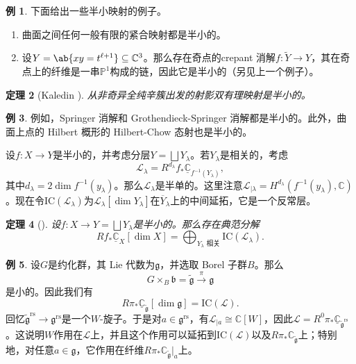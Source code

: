 \documentclass{amsart}
\newtheorem{thm}{定理}[section]
\theoremstyle{definition}
\newtheorem{exm}[thm]{例}
\newtheorem{exms}[thm]{例}
\theoremstyle{remark}
\theoremstyle{plain}
\theoremstyle{definition}
\theoremstyle{remark}
\newcommand{\C}{\mathbb{C}}
\renewcommand{\P}{\mathbb{P}}
\newcommand{\g}{\mathfrak{g}}
\renewcommand{\b}{\mathfrak{b}}
\newcommand{\mc}[1]{\mathcal{#1}}
\newcommand{\mr}[1]{\mathrm{#1}}
\newcommand{\on}[1]{\operatorname{#1}}
\newcommand{\ol}[1]{\overline{#1}}
\newcommand{\ul}[1]{\underline{#1}}
\newcommand{\1}{\mathbf{1}}
\newcommand{\2}{\mathbf{2}}
\newcommand{\3}{\mathbf{3}}
\begin{document}
\begin{exms}
    下面给出一些半小映射的例子。
    \begin{enumerate}
        \item 曲面之间任何一般有限的紧合映射都是半小的。
        \item 设\(Y = \ab\{xy = t^{\ell+1}\} \subseteq \C^3\)。那么存在奇点的crepant 消解\(f \colon \tilde{Y} \to Y\)，其在奇点上的纤维是一串\(\P^1\)构成的链，因此它是半小的（另见上一个例子）。
    \end{enumerate}
\end{exms}

\begin{thm}[Kaledin {\cite{Kaledin2006}}]
    从非奇异全纯辛簇出发的射影双有理映射是半小的。
\end{thm}

\begin{exm}
    例如，Springer 消解和 Grothendieck-Springer 消解都是半小的。此外，曲面上点的 Hilbert 概形的 Hilbert-Chow 态射也是半小的。
\end{exm}

设\(f \colon X \to Y\)是半小的，并考虑分层\(Y = \bigsqcup Y_{\lambda}\)。若\(Y_{\lambda}\)是相关的，考虑
\[ \mc{L}_{\lambda} = R^{d_{\lambda}} f_* \ul{\C}_{f^{-1}(Y_{\lambda})}, \]
其中\(d_{\lambda} = 2 \dim f^{-1} (y_{\lambda})\)。那么\(\mc{L}_{\lambda}\)是半单的。这里注意\(\mc{L}_{|\lambda} = H^{d_{\lambda}}(f^{-1}(y_{\lambda}), \C)\)。现在令\(\mr{IC}(\mc{L}_{\lambda})\)为\(\mc{L}_{\lambda}[\dim Y_{\lambda}]\)在\(\ol{Y}_{\lambda}\)上的中间延拓，它是一个反常层。

\begin{thm}[{\cite{DeCataldoMigliorini2002}}]
    设\(f \colon X \to Y = \bigsqcup Y_{\lambda}\)是半小的。那么存在典范分解
    \[ R f_* \ul{\C}_X[\dim X] = \bigoplus_{Y_{\lambda}\text{ 相关}} \mr{IC}(\mc{L}_{\lambda}). \]
\end{thm}

\begin{exm}
    设\(G\)是约化群，其 Lie 代数为\(\g\)，并选取 Borel 子群\(B\)。那么
    \[ G \times_B \b = \tilde{\g} \xrightarrow{\pi} \g \]
    是小的。因此我们有
    \[ R \pi_* \ul{\C}_{\tilde{\g}} [\dim \g] = \mr{IC}(\mc{L}). \]
    回忆\(\tilde{\g}^{\on{rs}} \to \g^{\on{rs}}\)是一个\(W\)-旋子。于是对\(a \in \g^{\on{rs}}\)，有\(\mc{L}_{|a} \cong \C[W]\)，因此\(\mc{L} = R^0 \pi_* \ul{\C}_{\tilde{\g}^{\on{rs}}}\)。这说明\(W\)作用在\(\mc{L}\)上，并且这个作用可以延拓到\(\mr{IC}(\mc{L})\)以及\(R \pi_* \C_{\tilde{\g}}\)上；特别地，对任意\(a \in \g\)，它作用在纤维\(R \pi_* \C_{\tilde{\g}}|_a\)上。
\end{exm}
\end{document}
